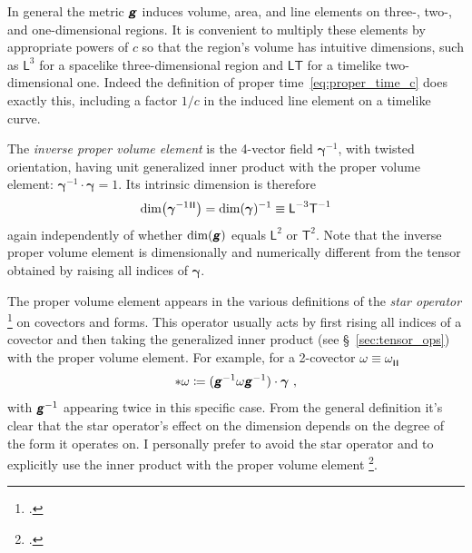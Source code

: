 \documentclass[\ifafour a4paper,12pt,\else a5paper,10pt,\fi%
onecolumn,oneside,article,%
british%
]{memoir}
\makeatletter
\theoremstyle{remark}
\theoremstyle{innote}
\newcommand*{\mathte}[1]{\textbf{\textit{\textsf{#1}}}}
\newcommand*{\citep}{\footcites}
\newcommand*{\defd}{\coloneqq}
\renewcommand*{\|}[1][]{\nonscript\,#1\vert\nonscript\;\mathopen{}}
\newcommand*{\sect}{\S}%
\newcommand*{\sects}{\S\S}%
\newcommand*{\eg}{{e.g.}}
\newcommand*{\cf}{{cf.}}
\newcommand*{\q}{}%
\DeclareRobustCommand*{\q}{%
  \mathord{\mathpalette\bigcdot@{}}%
}
\newcommand*{\bigcdot@scalefactor}{0.7}
\newcommand*{\bigcdot@widthfactor}{1.5}
\newcommand*{\bigcdot@}[2]{%
  \sbox0{$#1\vcenter{}$}%
  \sbox2{$#1\cdot\m@th$}%
  \hbox to \bigcdot@widthfactor\wd2{%
    \hfil
    \raise\ht0\hbox{%
      \scalebox{\bigcdot@scalefactor}{%
        \lower\ht0\hbox{$#1\bullet\m@th$}%
      }%
    }%
    \hfil
  }%
}
\newcommand*{\Le}{\textsf{L}}
\newcommand*{\Ti}{\textsf{T}}
\newcommand*{\Li}{\textsf{L}}
\newcommand*{\ii}{\cdot}
\newcommand*{\yg}{\mathte{g}}
\renewcommand*{\i}{\indices}
\newcommand*{\ygv}{\bm{\gamma}}
\newcommand*{\ygu}{\overline{\ygv}}
\newcommand*{\rul}{{\mkern2mu\rule[-0.1ex]{0.75pt}{1.1ex}\mkern2mu}}
\DeclarePairedDelimiter\mul{\rul}{\rul}%
\makeatother
\begin{document}
In general the metric $\yg$ induces volume, area, and line elements on
three-, two-, and one-dimensional regions. It is convenient to multiply
these elements by appropriate powers of $c$ so that the region's volume has
intuitive dimensions, such as $\Li^{3}$ for a spacelike three-dimensional
region and $\Li\Ti$ for a timelike two-dimensional one. Indeed the
definition of proper time~\eqref{eq:proper_time_c} does exactly this,
including a factor $1/c$ in the induced line element on a timelike curve.

The \emph{inverse proper volume element} is the 4-vector field $\ygv^{-1}$,
with twisted orientation, having unit generalized inner product with the
proper volume element: $\ygv^{-1} \ii \ygv = 1$. Its intrinsic dimension is
therefore
\begin{equation}
  \label{eq:dim_inv_volume_elem}
  \dim\bigl(\ygv^{-1}{}\i{^{\mul{\q\q\q\q}}}\bigr) =
  \dim(\ygv)^{-1} \equiv \Le^{-3}\Ti^{-1}
\end{equation}
again independently of whether $\dim(\yg)$ equals $\Li^{2}$ or $\Ti^{2}$.
Note that the inverse proper volume element is dimensionally and
numerically different from the tensor  obtained by raising all
indices of $\ygv$.%

\medskip

The proper volume element appears in the various definitions of the
\emph{star operator}
\citep[\eg][\sect~V.A.4]{choquetbruhatetal1977_r1996}[Box~4.3]{misneretal1970_r1973}[\sect~IV.24]{burke1985_r1987}
on covectors and forms. This operator usually acts by first rising all
indices of a covector and then taking the generalized inner product (see
\sect~\ref{sec:tensor_ops}) with the proper volume element. For example,
for a 2-covector $\omega \equiv \omega\i{_{\mul{\q\q}}}$
\begin{equation}
  \label{eq:star_op}
  *\omega \defd (\yg^{-1}\omega\yg^{-1})\ii\ygv \ ,
\end{equation}
with $\yg^{-1}$ appearing twice in this specific case. From the general
definition it's clear that the star operator's effect on the dimension
depends on the degree of the form it operates on. I personally prefer to
avoid the star operator and to explicitly use the inner product with the
proper volume element \citep[\cf][\sects~4.1--2]{bossavit1991}.
\end{document}
